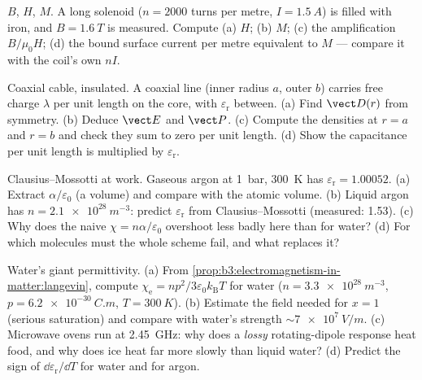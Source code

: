 \begin{exercise}[$\star$]\label{exo:b3:electromagnetism-in-matter:4}
$B$, $H$, $M$. A long solenoid ($n = \num{2000}$ turns per metre,
$I = \qty{1.5}{A}$) is filled with iron, and $B = \qty{1.6}{T}$ is
measured. Compute (a) $H$; (b) $M$; (c) the amplification
$B/\mu_0H$; (d) the bound surface current per metre equivalent to
$M$ --- compare it with the coil's own $nI$.
\end{exercise}

\begin{exercise}[$\star\star$]\label{exo:b3:electromagnetism-in-matter:5}
Coaxial cable, insulated. A coaxial line (inner radius $a$, outer
$b$) carries free charge $\lambda$ per unit length on the core,
with  $\varepsilon_{\text{r}}$ between. (a) Find
$\vect D(r)$ from symmetry. (b) Deduce $\vect E$ and $\vect P$.
(c) Compute the  densities at $r = a$ and $r = b$ and
check they sum to zero per unit length. (d) Show the capacitance
per unit length is multiplied by $\varepsilon_{\text{r}}$.
\end{exercise}

\begin{exercise}[$\star\star$]\label{exo:b3:electromagnetism-in-matter:6}
Clausius--Mossotti at work. Gaseous argon at \qty{1}{bar},
\qty{300}{K} has $\varepsilon_{\text{r}} = 1.00052$. (a) Extract
$\alpha/\varepsilon_0$ (a volume) and compare with the atomic
volume. (b) Liquid argon has $n = \qty{2.1e28}{m^{-3}}$: predict
$\varepsilon_{\text{r}}$ from Clausius--Mossotti (measured: 1.53).
(c) Why does the naive $\chi = n\alpha/\varepsilon_0$ overshoot
less badly here than for water? (d) For which molecules must the
whole scheme fail, and what replaces it?
\end{exercise}

\begin{exercise}[$\star\star$]\label{exo:b3:electromagnetism-in-matter:7}
Water's giant permittivity. (a) From
\cref{prop:b3:electromagnetism-in-matter:langevin}, compute
$\chi_{\text{e}} = np^2/3\varepsilon_0k_{\text{B}}T$ for water
($n = \qty{3.3e28}{m^{-3}}$, $p = \qty{6.2e-30}{C.m}$,
$T = \qty{300}{K}$). (b) Estimate the field needed for $x = 1$
(serious saturation) and compare with water's  strength
$\sim\qty{7e7}{V/m}$. (c) Microwave ovens run at \qty{2.45}{GHz}:
why does a \emph{lossy} rotating-dipole response heat food, and
why does ice heat far more slowly than liquid water? (d) Predict
the sign of $\dd\varepsilon_{\text{r}}/\dd T$ for water and for
argon.
\end{exercise}


